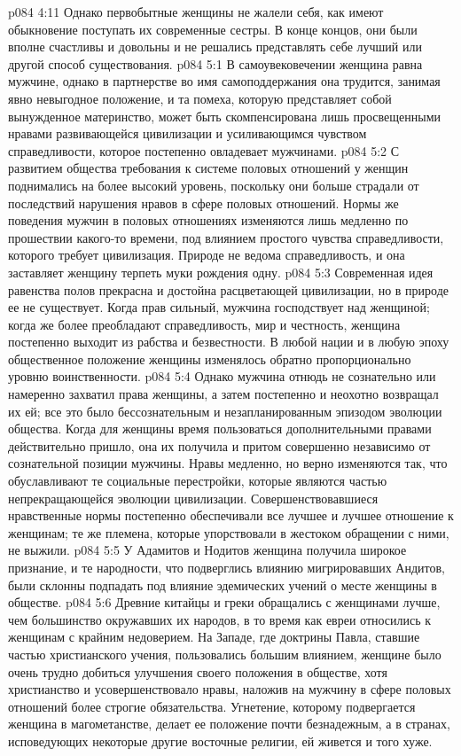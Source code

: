 \vs p084 4:11 Однако первобытные женщины не жалели себя, как имеют обыкновение поступать их современные сестры. В конце концов, они были вполне счастливы и довольны и не решались представлять себе лучший или другой способ существования.
\vs p084 5:1 В самоувековечении женщина равна мужчине, однако в партнерстве во имя самоподдержания она трудится, занимая явно невыгодное положение, и та помеха, которую представляет собой вынужденное материнство, может быть скомпенсирована лишь просвещенными нравами развивающейся цивилизации и усиливающимся чувством справедливости, которое постепенно овладевает мужчинами.
\vs p084 5:2 С развитием общества требования к системе половых отношений у женщин поднимались на более высокий уровень, поскольку они больше страдали от последствий нарушения нравов в сфере половых отношений. Нормы же поведения мужчин в половых отношениях изменяются лишь медленно по прошествии какого\hyp{}то времени, под влиянием простого чувства справедливости, которого требует цивилизация. Природе не ведома справедливость, и она заставляет женщину терпеть муки рождения одну.
\vs p084 5:3 Современная идея равенства полов прекрасна и достойна расцветающей цивилизации, но в природе ее не существует. Когда прав сильный, мужчина господствует над женщиной; когда же более преобладают справедливость, мир и честность, женщина постепенно выходит из рабства и безвестности. В любой нации и в любую эпоху общественное положение женщины изменялось обратно пропорционально уровню воинственности.
\vs p084 5:4 Однако мужчина отнюдь не сознательно или намеренно захватил права женщины, а затем постепенно и неохотно возвращал их ей; все это было бессознательным и незапланированным эпизодом эволюции общества. Когда для женщины время пользоваться дополнительными правами действительно пришло, она их получила и притом совершенно независимо от сознательной позиции мужчины. Нравы медленно, но верно изменяются так, что обуславливают те социальные перестройки, которые являются частью непрекращающейся эволюции цивилизации. Совершенствовавшиеся нравственные нормы постепенно обеспечивали все лучшее и лучшее отношение к женщинам; те же племена, которые упорствовали в жестоком обращении с ними, не выжили.
\vs p084 5:5 \pc У Адамитов и Нодитов женщина получила широкое признание, и те народности, что подверглись влиянию мигрировавших Андитов, были склонны подпадать под влияние эдемических учений о месте женщины в обществе.
\vs p084 5:6 Древние китайцы и греки обращались с женщинами лучше, чем большинство окружавших их народов, в то время как евреи относились к женщинам с крайним недоверием. На Западе, где доктрины Павла, ставшие частью христианского учения, пользовались большим влиянием, женщине было очень трудно добиться улучшения своего положения в обществе, хотя христианство и усовершенствовало нравы, наложив на мужчину в сфере половых отношений более строгие обязательства. Угнетение, которому подвергается женщина в магометанстве, делает ее положение почти безнадежным, а в странах, исповедующих некоторые другие восточные религии, ей живется и того хуже.
